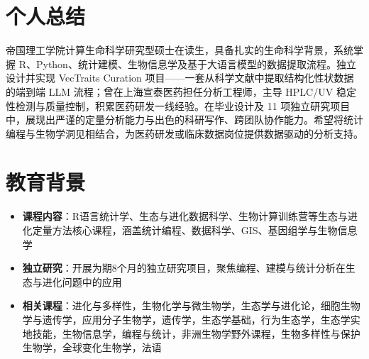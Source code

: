 \documentclass{my-resume}
\begin{document}


\section{个人总结}
帝国理工学院计算生命科学研究型硕士在读生，具备扎实的生命科学背景，系统掌握 R、Python、统计建模、生物信息学及基于大语言模型的数据提取流程。独立设计并实现 VecTraits Curation 项目——一套从科学文献中提取结构化性状数据的端到端 LLM 流程；曾在上海宣泰医药担任分析工程师，主导 HPLC/UV 稳定性检测与质量控制，积累医药研发一线经验。在毕业设计及 11 项独立研究项目中，展现出严谨的定量分析能力与出色的科研写作、跨团队协作能力。希望将统计编程与生物学洞见相结合，为医药研发或临床数据岗位提供数据驱动的分析支持。

\section{教育背景}
\begin{itemize}[parsep=0.2ex]
  \item \textbf{课程内容}：R语言统计学、生态与进化数据科学、生物计算训练营等生态与进化定量方法核心课程，涵盖统计编程、数据科学、GIS、基因组学与生物信息学
  \item \textbf{独立研究}：开展为期8个月的独立研究项目，聚焦编程、建模与统计分析在生态与进化问题中的应用
\end{itemize}
\begin{itemize}[parsep=0.2ex]
  \item \textbf{相关课程}：进化与多样性，生物化学与微生物学，生态学与进化论，细胞生物学与遗传学，应用分子生物学，遗传学，生态学基础，行为生态学，生态学实地技能，生物信息学，编程与统计，非洲生物学野外课程，生物多样性与保护生物学，全球变化生物学，法语
\end{itemize}
\end{document}
